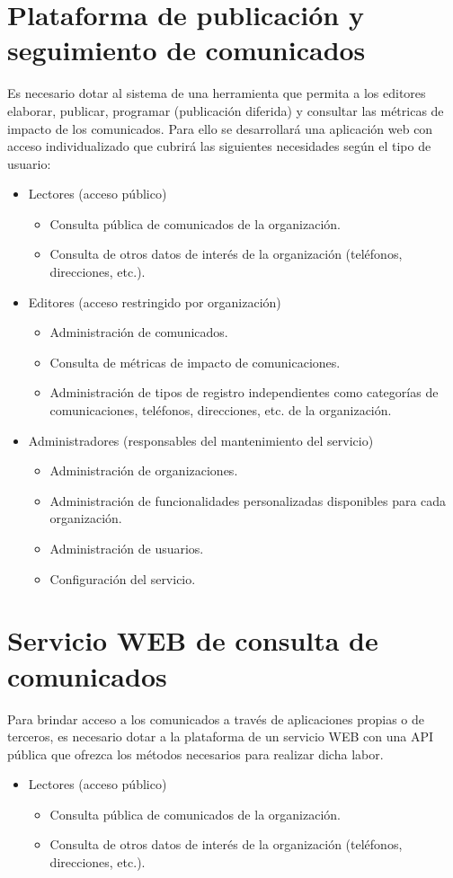 \section{Plataforma de publicación y seguimiento de comunicados}
Es necesario dotar al sistema de una herramienta que permita a los editores elaborar, publicar, programar (publicación diferida) y consultar las métricas de impacto de los comunicados. Para ello se desarrollará una aplicación web con acceso individualizado que cubrirá las siguientes necesidades según el tipo de usuario:
\begin{itemize}
    \item Lectores (acceso público)
    \begin{itemize}
        \item Consulta pública de comunicados de la organización.
        \item Consulta de otros datos de interés de la organización (teléfonos, direcciones, etc.).
    \end{itemize}
    \item Editores (acceso restringido por organización)
    \begin{itemize}
        \item Administración de comunicados.
        \item Consulta de métricas de impacto de comunicaciones.
        \item Administración de tipos de registro independientes como categorías de comunicaciones, teléfonos, direcciones, etc. de la organización.
    \end{itemize}
    \item Administradores (responsables del mantenimiento del servicio)
    \begin{itemize}
        \item Administración de organizaciones.
        \item Administración de funcionalidades personalizadas disponibles para cada organización.
        \item Administración de usuarios.
        \item Configuración del servicio.
    \end{itemize}
\end{itemize}

\section{Servicio WEB de consulta de comunicados}
Para brindar acceso a los comunicados a través de aplicaciones propias o de terceros, es necesario dotar a la plataforma de un servicio WEB con una API pública que ofrezca los métodos necesarios para realizar dicha labor.
\begin{itemize}
    \item Lectores (acceso público)
    \begin{itemize}
        \item Consulta pública de comunicados de la organización.
        \item Consulta de otros datos de interés de la organización (teléfonos, direcciones, etc.).
    \end{itemize}
\end{itemize}

